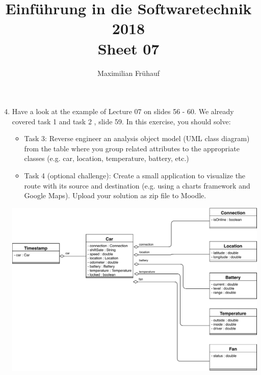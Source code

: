 \documentclass[a4paper, 10pt]{article}
\title{Einführung in die Softwaretechnik 2018 \\ Sheet 07}
\author{Maximilian Frühauf}
\begin{document}
\maketitle
\begin{enumerate}
    \setcounter{enumi}{3}
    \item
    Have a look at the example of Lecture 07 on slides 56 - 60. We already covered task 1 and task 2 , slide 59. In this exercise, you should solve:
    \begin{itemize}
        \item Task 3: Reverse engineer an analysis object model (UML class diagram) from the
    table where you group related attributes to the appropriate classes (e.g. car,
    location, temperature, battery, etc.)
        \item Task 4 (optional challenge): Create a small application to visualize the route with
    its source and destination (e.g. using a charts framework and Google Maps). Upload your solution as zip file to Moodle.
    \end{itemize}
    
    \includegraphics[width=\linewidth]{Task03.pdf}
\end{enumerate}
\end{document}
